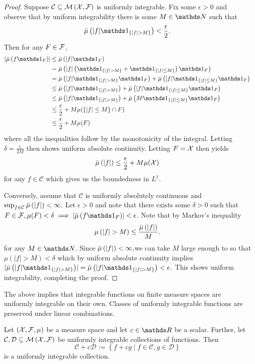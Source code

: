 \begin{proof}
Suppose $\mathcal{C}\subseteq\mathcal{M}\left(\mathcal{X},\mathcal{F}\right)$ is uniformly integrable.
Fix some $\epsilon>0$ and observe that by uniform integrability there
is some $M\in\N$ such that 
\[
\lebInt{\mu}{\lvert f\rvert\indicate_{\{\lvert f\rvert>M\}}}<\frac{\epsilon}{2}.
\]
Then for any $F\in\mathcal{F}$,
\begin{align*}
\lvert\lebInt{\mu}{f\indicate_{F}}\rvert & \leq\lebInt{\mu}{\lvert f\rvert\indicate_{F}}\\
 & =\lebInt{\mu}{\lvert f\rvert\left(\indicate_{\{\lvert f\rvert>M\}}+\indicate_{\{\lvert f\rvert\leq M\}}\right)\indicate_{F}}\\
 & =\lebInt{\mu}{\lvert f\rvert\indicate_{\{\lvert f\rvert>M\}}\indicate_{F}}+\lebInt{\mu}{\lvert f\rvert\indicate_{\{\lvert f\rvert\leq M\}}\indicate_{F}}\\
 & \leq\lebInt{\mu}{\lvert f\rvert\indicate_{\{\lvert f\rvert>M\}}}+\lebInt{\mu}{\lvert f\rvert\indicate_{\{\lvert f\rvert\leq M\}}\indicate_{F}}\\
 & \leq\lebInt{\mu}{\lvert f\rvert\indicate_{\{\lvert f\rvert>M\}}}+\lebInt{\mu}{M\indicate_{\{\lvert f\rvert\leq M\}}\indicate_{F}}\\
 & \leq\frac{\epsilon}{2}+M\mu(\{\lvert f\rvert\leq M\}\cap F)\\
 & \leq\frac{\epsilon}{2}+M\mu(F)
\end{align*}
where all the inequalities follow by the monotonicity of the integral.
Letting $\delta=\frac{\epsilon}{2M}$ then shows uniform absolute
continuity. Letting $F=\mathcal{X}$ then yields 
\[
\bar{\mu}\left(\lvert f\rvert\right)\leq\frac{\epsilon}{2}+M\mu(\mathcal{X})
\]
for any $f\in\mathcal{C}$ which gives us the boundedness in $L^{1}$.

Conversely, assume that $\mathcal{C}$ is uniformly absolutely continuous
and $\sup_{f\in\mathcal{C}}\bar{\mu}\left(\lvert f\rvert\right)<\infty.$
Let $\epsilon>0$ and note that there exists some $\delta>0$ such
that $F\in\F,\mu(F)<\delta\implies\lvert\lebInt{\mu}{f\indicate_{F}}\rvert<\epsilon$.
Note that by Markov's inequality
\[
\mu\left(\lvert f\rvert>M\right)\leq\frac{\bar{\mu}\left(\lvert f\rvert\right)}{M}.
\]
for any $M\in\N$. Since $\bar{\mu}\left(\lvert f\rvert\right)<\infty,$we
can take $M$ large enough to so that $\mu\left(\lvert f\rvert>M\right)<\delta$
which by uniform absolute continuity implies $\lvert\lebInt{\mu}{\lvert f\lvert\indicate_{\{\lvert f\rvert>M\}}}\rvert=\lebInt{\mu}{\lvert f\lvert\indicate_{\{\lvert f\rvert>M\}}}<\epsilon.$
This shows uniform integrability, completing the proof.
\end{proof}
The above implies that integrable functions on finite measure spaces
are uniformly integrable on their own. Classes of uniformly integrable
functions are preserved under linear combinations.
\begin{prop}
\label{prop:uniformlyIntegrableLinearCombination}Let $\left(\mathcal{X},\mathcal{F},\mu\right)$
be a measure space and let $c\in\R$ be a scalar. Further, let $\mathcal{C},\mathcal{D}\subseteq\mathcal{M}\left(\mathcal{X},\mathcal{F}\right)$
be uniformly integrable collections of functions. Then 
\[
\mathcal{C}+c\mathcal{D}:=\left\{ f+cg\mid f\in\mathcal{C},g\in\mathcal{D}\right\} 
\]
is a uniformly integrable collection.
\end{prop}

